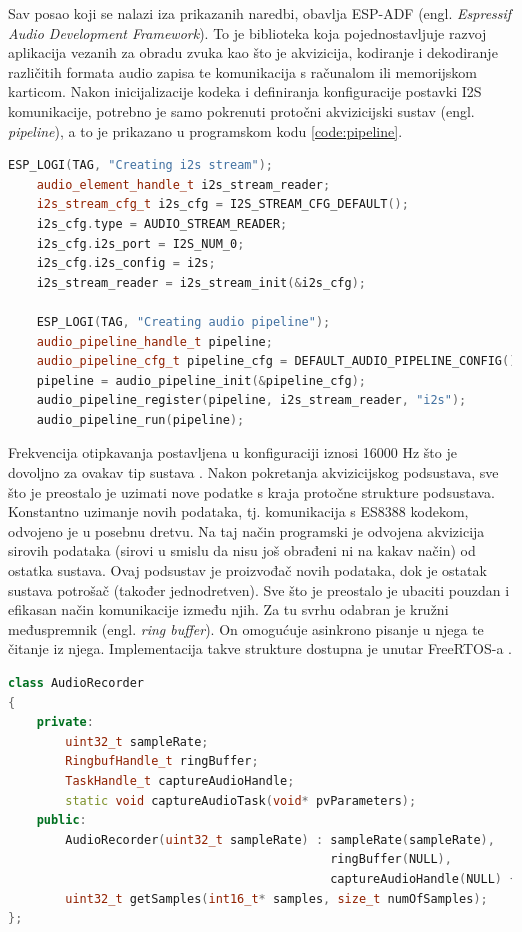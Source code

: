 Sav posao koji se nalazi iza prikazanih naredbi, obavlja ESP-ADF
(engl. \textit{Espressif Audio Development Framework}). To je biblioteka koja pojednostavljuje
razvoj aplikacija vezanih za obradu zvuka kao što je akvizicija, kodiranje i 
dekodiranje različitih formata audio zapisa te komunikacija s računalom ili 
memorijskom karticom.
Nakon inicijalizacije kodeka i definiranja konfiguracije postavki I2S komunikacije,
potrebno je samo pokrenuti protočni akvizicijski sustav (engl. \textit{pipeline}), 
a to je prikazano u programskom kodu \ref{code:pipeline}.\\

\begin{lstlisting}[language=C++, caption=Pokretanje akvizicijskog sustava, label=code:pipeline]
    ESP_LOGI(TAG, "Creating i2s stream");
    audio_element_handle_t i2s_stream_reader;
    i2s_stream_cfg_t i2s_cfg = I2S_STREAM_CFG_DEFAULT();
    i2s_cfg.type = AUDIO_STREAM_READER;
    i2s_cfg.i2s_port = I2S_NUM_0;
    i2s_cfg.i2s_config = i2s;
    i2s_stream_reader = i2s_stream_init(&i2s_cfg);

    ESP_LOGI(TAG, "Creating audio pipeline");
    audio_pipeline_handle_t pipeline;
    audio_pipeline_cfg_t pipeline_cfg = DEFAULT_AUDIO_PIPELINE_CONFIG();
    pipeline = audio_pipeline_init(&pipeline_cfg);
    audio_pipeline_register(pipeline, i2s_stream_reader, "i2s");
    audio_pipeline_run(pipeline);
\end{lstlisting}

Frekvencija otipkavanja postavljena u konfiguraciji iznosi 16000 Hz što
je dovoljno za ovakav tip sustava \cite{wardentinyml}.
Nakon pokretanja akvizicijskog podsustava, sve što je preostalo je uzimati nove
podatke s kraja protočne strukture podsustava. Konstantno uzimanje novih podataka, tj. komunikacija
s ES8388 kodekom, odvojeno je u posebnu dretvu. Na taj način programski je 
odvojena akvizicija sirovih podataka (sirovi u smislu da nisu još obrađeni ni
na kakav način) od ostatka sustava. Ovaj podsustav je proizvođač novih podataka,
dok je ostatak sustava potrošač (također jednodretven). Sve što je preostalo je
ubaciti pouzdan i efikasan način komunikacije između njih. Za tu svrhu odabran je
kružni međuspremnik (engl. \textit{ring buffer}). On omogućuje asinkrono pisanje u njega
te čitanje iz njega. Implementacija takve strukture dostupna je unutar FreeRTOS-a 
\cite{ringbufferrr}. 


\begin{lstlisting}[language=C++, caption=Razred AudioRecorder, label=code:AudioRecorder]
class AudioRecorder
{
    private:
        uint32_t sampleRate;
        RingbufHandle_t ringBuffer;
        TaskHandle_t captureAudioHandle;
        static void captureAudioTask(void* pvParameters);
    public:
        AudioRecorder(uint32_t sampleRate) : sampleRate(sampleRate), 
                                             ringBuffer(NULL), 
                                             captureAudioHandle(NULL) {}
        uint32_t getSamples(int16_t* samples, size_t numOfSamples);
};
\end{lstlisting}

